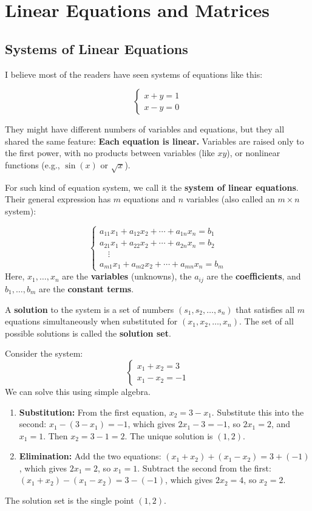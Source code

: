 \section{Linear Equations and Matrices}

\subsection{Systems of Linear Equations}

I believe most of the readers have seen systems of equations like this:

\[
\begin{cases}
x+y=1\\
x-y =0
\end{cases}
\]

They might have different numbers of variables and equations, but they all shared the same feature: \textbf{Each equation is linear.} Variables are raised only to the first power, with no products between variables (like $xy$), or nonlinear functions (e.g., $\sin(x)$ or $\sqrt{x}$).

For such kind of equation system, we call it the \textbf{system of linear equations}. Their general expression has $m$ equations and $n$ variables (also called an $m \times n$ system):

\[
\begin{cases}
a_{11}x_1 + a_{12}x_2 + \cdots + a_{1n}x_n = b_1\\
a_{21}x_1 + a_{22}x_2 + \cdots + a_{2n}x_n = b_2\\
\quad \vdots \\
a_{m1}x_1 + a_{m2}x_2 + \cdots + a_{mn}x_n = b_m
\end{cases}
\]
Here, $x_1, \ldots, x_n$ are the \textbf{variables} (unknowns), the $a_{ij}$ are the \textbf{coefficients}, and $b_1, \ldots, b_m$ are the \textbf{constant terms}.

A \textbf{solution} to the system is a set of numbers $(s_1, s_2, \ldots, s_n)$ that satisfies all $m$ equations simultaneously when substituted for $(x_1, x_2, \ldots, x_n)$. The set of all possible solutions is called the \textbf{solution set}.

\begin{example}[A 2x2 System]
Consider the system:
\[
\begin{cases}
x_1 + x_2 = 3 \\
x_1 - x_2 = -1
\end{cases}
\]
We can solve this using simple algebra.
\begin{enumerate}
    \item \textbf{Substitution:} From the first equation, $x_2 = 3 - x_1$. Substitute this into the second: $x_1 - (3 - x_1) = -1$, which gives $2x_1 - 3 = -1$, so $2x_1 = 2$, and $x_1 = 1$. Then $x_2 = 3 - 1 = 2$. The unique solution is $(1, 2)$.
    \item \textbf{Elimination:} Add the two equations: $(x_1 + x_2) + (x_1 - x_2) = 3 + (-1)$, which gives $2x_1 = 2$, so $x_1 = 1$. Subtract the second from the first: $(x_1 + x_2) - (x_1 - x_2) = 3 - (-1)$, which gives $2x_2 = 4$, so $x_2 = 2$.
\end{enumerate}
The solution set is the single point $(1, 2)$.
\end{example}

